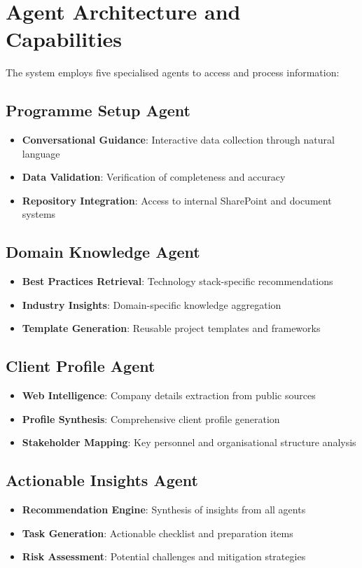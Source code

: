 \documentclass{article}
\begin{document}
\section{Agent Architecture and Capabilities}
The system employs five specialised agents to access and process information:

\subsection{Programme Setup Agent}
\begin{itemize}
    \item \textbf{Conversational Guidance}: Interactive data collection through natural language
    \item \textbf{Data Validation}: Verification of completeness and accuracy
    \item \textbf{Repository Integration}: Access to internal SharePoint and document systems
\end{itemize}

\subsection{Domain Knowledge Agent}
\begin{itemize}
    \item \textbf{Best Practices Retrieval}: Technology stack-specific recommendations
    \item \textbf{Industry Insights}: Domain-specific knowledge aggregation
    \item \textbf{Template Generation}: Reusable project templates and frameworks
\end{itemize}

\subsection{Client Profile Agent}
\begin{itemize}
    \item \textbf{Web Intelligence}: Company details extraction from public sources
    \item \textbf{Profile Synthesis}: Comprehensive client profile generation
    \item \textbf{Stakeholder Mapping}: Key personnel and organisational structure analysis
\end{itemize}

\subsection{Actionable Insights Agent}
\begin{itemize}
    \item \textbf{Recommendation Engine}: Synthesis of insights from all agents
    \item \textbf{Task Generation}: Actionable checklist and preparation items
    \item \textbf{Risk Assessment}: Potential challenges and mitigation strategies
\end{itemize}
\end{document}
